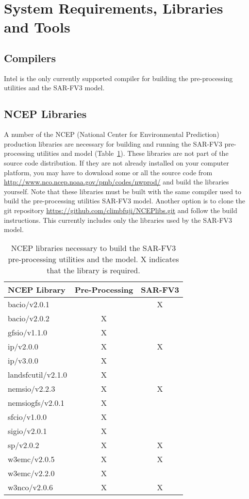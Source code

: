 \section{System Requirements, Libraries and Tools}

\subsection{Compilers}

Intel is the only currently supported compiler for building the pre-processing utilities and the SAR-FV3 model.

\subsection{NCEP Libraries}

A number of the NCEP (National Center for Environmental Prediction) production libraries are necessary
for building and running the SAR-FV3 pre-processing utilities and model (Table~\ref{tab:ncep_libs}).
These libraries are not part of the source code distribution.
If they are not already installed on your computer platform, you may have to download some or all the
source code from \url{http://www.nco.ncep.noaa.gov/pmb/codes/nwprod/} and build the libraries yourself.
Note that these libraries must be built with the same compiler used to build the pre-processing utilities
SAR-FV3 model.
Another option is to clone the git repository \url{https://github.com/climbfuji/NCEPlibs.git} and follow
the build instructions.  This currently includes only the libraries used by the SAR-FV3 model.

\begin{table}[!htb]
\begin{center}
\begin{tabular}{ l c c }
\hline
 NCEP Library & Pre-Processing & SAR-FV3 \\ 
\hline
 bacio/v2.0.1       &   & X \\ 
 bacio/v2.0.2       & X &   \\ 
 gfsio/v1.1.0       & X &   \\ 
 ip/v2.0.0          & X & X \\  
 ip/v3.0.0          & X &   \\  
 landsfcutil/v2.1.0 & X &   \\ 
 nemsio/v2.2.3      & X & X \\ 
 nemsiogfs/v2.0.1   & X &   \\ 
 sfcio/v1.0.0       & X &   \\ 
 sigio/v2.0.1       & X &   \\ 
 sp/v2.0.2          & X & X \\ 
 w3emc/v2.0.5       & X & X \\   
 w3emc/v2.2.0       & X &   \\   
 w3nco/v2.0.6       & X & X \\
\hline
\end{tabular}
\caption{\label{tab:ncep_libs}NCEP libraries necessary to build the SAR-FV3 pre-processing utilities and the model.
                              X indicates that the library is required.}
\end{center}
\end{table}

